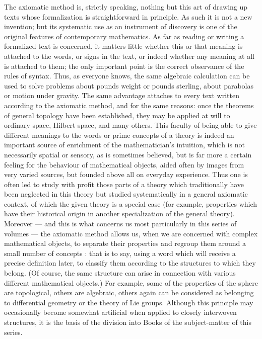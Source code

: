 The axiomatic method is, strictly speaking, nothing but this art of drawing up texts whose formalization is straightforward in principle. As such it is not a new invention; but its systematic use as an instrument of discovery is one of the original features of contemporary mathematics. As far as reading or writing a formalized text is concerned, it matters little whether this or that meaning is attached to the words, or signs in the text, or indeed whether any meaning at all is attached to them; the only important point is the correct observance of the rules of syntax. Thus, as everyone knows, the same algebraic calculation can be used to solve problems about pounds weight or pounds sterling, about parabolas or motion under gravity. The same advantage attaches to every text written according to the axiomatic method, and for the same reasons: once the theorems of general topology have been established, they may be applied at will to ordinary space, Hilbert space, and many others. This faculty of being able to give different meanings to the words or prime concepts of a theory is indeed an important source of enrichment of the mathematician's intuition, which is not necessarily spatial or sensory, as is sometimes believed, but is far more a certain feeling for the behaviour of mathematical objects, aided often by images from very varied sources, but founded above all on everyday experience. Thus one is often led to study with profit those parts of a theory which traditionally have been neglected in this theory but studied systematically in a general axiomatic context, of which the given theory is a special case (for example, properties which have their historical origin in another specialization of the general theory). Moreover --- and this is what concerns us most particularly in this series of volumes --- the axiomatic method allows us, when we are concerned with complex mathematical objects, to separate their properties and regroup them around a small number of concepts : that is to say, using a word which will receive a precise definition later, to classify them according to the structures to which they belong. (Of course, the same structure can arise in connection with various different mathematical objects.) For example, some of the properties of the sphere are topological, others are algebraic, others again can be considered as belonging to differential geometry or the theory of Lie groups. Although this principle may occasionally become somewhat artificial when applied to closely interwoven structures, it is the basis of the division into Books of the subject-matter of this series.

